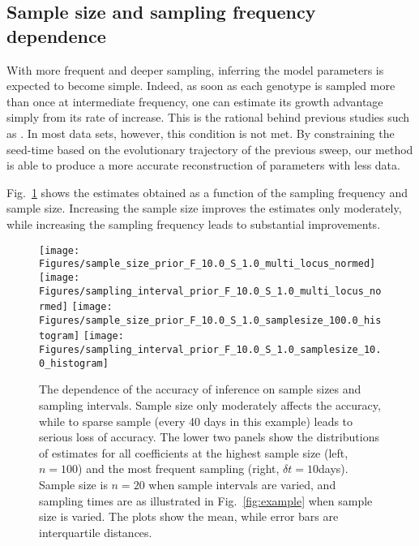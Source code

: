 \documentclass[rmp,twocolumn]{revtex4}
\newcommand{\FIG}[1]{Fig.~\ref{fig:#1}}
\begin{document}
\subsection*{Sample size and sampling frequency dependence} 
With more frequent and deeper sampling, inferring the model parameters is
expected to become simple. Indeed, as soon as each genotype is sampled more than
once at intermediate frequency, one can estimate its growth advantage simply
from its rate of increase. This is the rational behind previous studies such as
\citep{Asquith:2006p28003,Ganusov:2011p43139}. In most data sets, however, this
condition is not met. By constraining the seed-time based on the evolutionary
trajectory of the previous sweep, our method is able to produce a more accurate
reconstruction of parameters with less data. 


\FIG{sample} shows the estimates obtained as a function of the sampling
frequency and sample size. Increasing the sample size improves the estimates
only moderately, while increasing the sampling frequency leads to substantial
improvements.

\begin{figure}[htp]
\begin{center}
  \texttt{[image: Figures/sample\_size\_prior\_F\_10.0\_S\_1.0\_multi\_locus\_normed]}
  \texttt{[image: Figures/sampling\_interval\_prior\_F\_10.0\_S\_1.0\_multi\_locus\_normed]}
  \texttt{[image: Figures/sample\_size\_prior\_F\_10.0\_S\_1.0\_samplesize\_100.0\_histogram]}
  \texttt{[image: Figures/sampling\_interval\_prior\_F\_10.0\_S\_1.0\_samplesize\_10.0\_histogram]}
  \caption[labelInTOC]{The dependence of the accuracy of inference on sample
  sizes and sampling intervals. Sample size only moderately affects the
  accuracy, while to sparse sample (every 40 days in this example) leads to
  serious loss of accuracy. The lower two panels show the distributions of
  estimates for all coefficients at the highest sample size (left, $n=100$) and
  the most frequent sampling (right, $\delta t = 10$days). Sample size is
  $n=20$ when sample intervals are varied, and sampling times are as
  illustrated in \FIG{example} when sample size is varied. The plots show the
  mean, while error bars are interquartile distances.}
  \label{fig:sample}
\end{center}
\end{figure}
\end{document}
